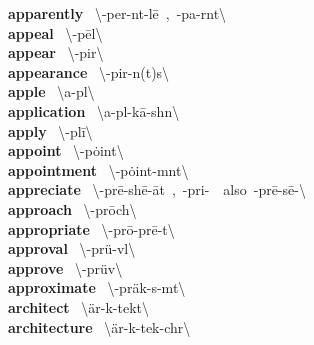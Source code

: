 \documentclass[10pt,a4paper]{article}
\begin{document}
\begin{multicols}{2}
\textbf{ apparently }\quad \ \textbackslash \textschwa -\textprimstress per-\textschwa nt-l\={e}\ ,\ -\textprimstress pa-r\textschwa nt\textbackslash \\
\textbf{ appeal }\quad \ \textbackslash \textschwa -\textprimstress p\={e}l\textbackslash \\
\textbf{ appear }\quad \ \textbackslash \textschwa -\textprimstress pir\textbackslash \\
\textbf{ appearance }\quad \ \textbackslash \textschwa -\textprimstress pir-\textschwa n(t)s\textbackslash \\
\textbf{ apple }\quad \ \textbackslash \textprimstress a-p\textschwa l\textbackslash \\
\textbf{ application }\quad \ \textbackslash \textsecstress a-pl\textschwa -\textprimstress k\={a}-sh\textschwa n\textbackslash \\
\textbf{ apply }\quad \ \textbackslash \textschwa -\textprimstress pl\={i}\textbackslash \\
\textbf{ appoint }\quad \ \textbackslash \textschwa -\textprimstress p\.{o}int\textbackslash \\
\textbf{ appointment }\quad \ \textbackslash \textschwa -\textprimstress p\.{o}int-m\textschwa nt\textbackslash \\
\textbf{ appreciate }\quad \ \textbackslash \textschwa -\textprimstress pr\={e}-sh\={e}-\textsecstress \={a}t\ ,\ -\textprimstress pri-\ \ also\ -\textprimstress pr\={e}-s\={e}-\textbackslash \\
\textbf{ approach }\quad \ \textbackslash \textschwa -\textprimstress pr\={o}ch\textbackslash \\
\textbf{ appropriate }\quad \ \textbackslash \textschwa -\textprimstress pr\={o}-pr\={e}-\textschwa t\textbackslash \\
\textbf{ approval }\quad \ \textbackslash \textschwa -\textprimstress pr\"{u}-v\textschwa l\textbackslash \\
\textbf{ approve }\quad \ \textbackslash \textschwa -\textprimstress pr\"{u}v\textbackslash \\
\textbf{ approximate }\quad \ \textbackslash \textschwa -\textprimstress pr\"{a}k-s\textschwa -m\textschwa t\textbackslash \\
\textbf{ architect }\quad \ \textbackslash \textprimstress \"{a}r-k\textschwa -\textsecstress tekt\textbackslash \\
\textbf{ architecture }\quad \ \textbackslash \textprimstress \"{a}r-k\textschwa -\textsecstress tek-ch\textschwa r\textbackslash \\

\end{multicols}
\end{document}
